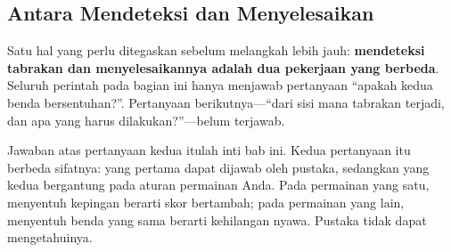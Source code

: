 \subsection{Antara Mendeteksi dan Menyelesaikan}

Satu hal yang perlu ditegaskan sebelum melangkah lebih jauh: \textbf{mendeteksi
tabrakan dan menyelesaikannya adalah dua pekerjaan yang berbeda}. Seluruh
perintah pada bagian ini hanya menjawab pertanyaan ``apakah kedua benda
bersentuhan?''. Pertanyaan berikutnya---``dari sisi mana tabrakan terjadi, dan
apa yang harus dilakukan?''---belum terjawab.

Jawaban atas pertanyaan kedua itulah inti bab ini. Kedua
pertanyaan itu berbeda sifatnya: yang pertama dapat dijawab oleh pustaka,
sedangkan yang kedua bergantung pada aturan permainan Anda. Pada permainan
yang satu, menyentuh kepingan berarti skor bertambah; pada permainan yang lain,
menyentuh benda yang sama berarti kehilangan nyawa. Pustaka tidak dapat
mengetahuinya.
